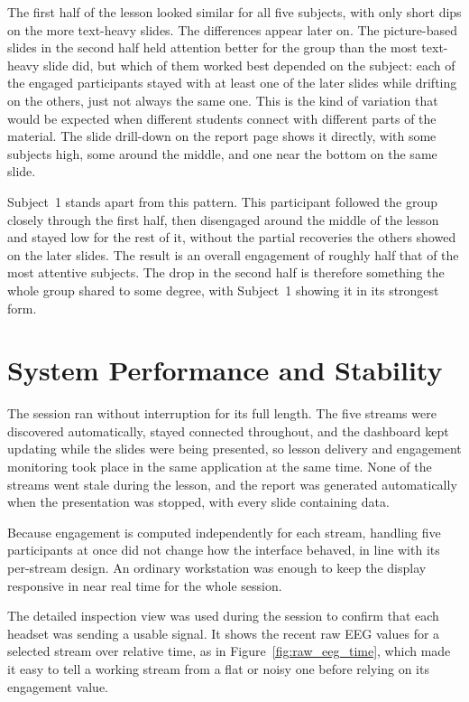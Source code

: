 The first half of the lesson looked similar for all five subjects, with only short dips on the more text-heavy slides. The differences appear later on. The picture-based slides in the second half held attention better for the group than the most text-heavy slide did, but which of them worked best depended on the subject: each of the engaged participants stayed with at least one of the later slides while drifting on the others, just not always the same one. This is the kind of variation that would be expected when different students connect with different parts of the material. The slide drill-down on the report page shows it directly, with some subjects high, some around the middle, and one near the bottom on the same slide.

Subject~1 stands apart from this pattern. This participant followed the group closely through the first half, then disengaged around the middle of the lesson and stayed low for the rest of it, without the partial recoveries the others showed on the later slides. The result is an overall engagement of roughly half that of the most attentive subjects. The drop in the second half is therefore something the whole group shared to some degree, with Subject~1 showing it in its strongest form.

\section{System Performance and Stability}\label{sect:perfasses}
The session ran without interruption for its full length. The five streams were discovered automatically, stayed connected throughout, and the dashboard kept updating while the slides were being presented, so lesson delivery and engagement monitoring took place in the same application at the same time. None of the streams went stale during the lesson, and the report was generated automatically when the presentation was stopped, with every slide containing data.

Because engagement is computed independently for each stream, handling five participants at once did not change how the interface behaved, in line with its per-stream design. An ordinary workstation was enough to keep the display responsive in near real time for the whole session.

The detailed inspection view was used during the session to confirm that each headset was sending a usable signal. It shows the recent raw EEG values for a selected stream over relative time, as in Figure~\ref{fig:raw_eeg_time}, which made it easy to tell a working stream from a flat or noisy one before relying on its engagement value.


